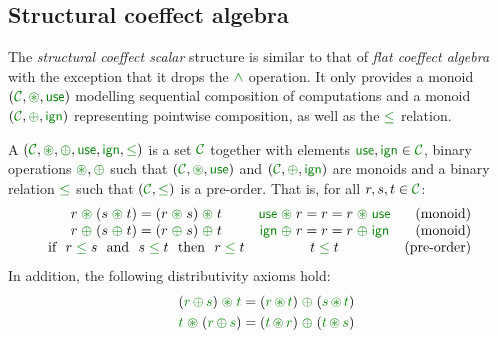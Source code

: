 
\subsection{Structural coeffect algebra}

The \emph{structural coeffect scalar} structure is similar to that of \emph{flat coeffect algebra}
with the exception that it drops the $\czip$ operation. It only provides a monoid $(\C, \cseq, \cunit)$
modelling sequential composition of computations and a monoid $(\C, \cpar, \czero)$ representing
pointwise composition, as well as the $\cleq$ relation.

\begin{definition}
\label{def:structural-scalar}
A \emph{} $(\C, \cseq, \cpar, \cunit, \czero, \cleq)$ is a set
$\C$ together with elements $\cunit, \czero \in \C$, binary operations $\cseq, \cpar$ such that
$(\C, \cseq, \cunit)$ and $(\C, \cpar, \czero)$ are monoids and a binary relation $\cleq$ such
that $(\C, \cleq)$ is a pre-order. That is, for all $r,s,t\in \C$:
%
\begin{equation*}
\begin{array}{ccr}
r \;\cseq\; (s \;\cseq\; t) = (r \;\cseq\; s) \;\cseq\; t  &
\cunit \;\cseq\; r = r = r \;\cseq\; \cunit &
\textnormal{(monoid)}
\\
r \;\cpar\; (s \;\cpar\; t) = (r \;\cpar\; s) \;\cpar\; t &
\czero \;\cpar\; r = r = r \;\cpar\; \czero &
\textnormal{(monoid)}
\\
\textnormal{if}~~r\; \cleq\; s ~~\textnormal{and}~~s\; \cleq\; t~~\textnormal{then}~~r\; \cleq\; t&
t\; \cleq\; t &
\textnormal{(pre-order)}
\\
\end{array}
\end{equation*}
%
In addition, the following distributivity axioms hold:
\begin{align*}
\quad (\cclrd{r}\, \cpar\, \cclrd{s}) \;\cseq\; \cclrd{t} & = (\cclrd{r} \,\cseq\, \cclrd{t}) \;\cpar\; (\cclrd{s}\, \cseq\, \cclrd{t}) \\
\quad \cclrd{t} \;\cseq\; (\cclrd{r}\, \cpar\, \cclrd{s}) & = (\cclrd{t} \,\cseq\, \cclrd{r}) \;\cpar\; (\cclrd{t}\, \cseq\, \cclrd{s})
\end{align*}
\end{definition}


